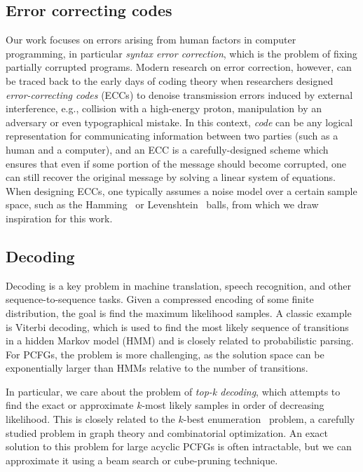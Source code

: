 \documentclass[sigplan,review,acmsmall,nonacm,screen,anonymous]{acmart}\settopmatter{printfolios=false,printccs=false,printacmref=false}
\begin{document}
\subsection{Error correcting codes}

Our work focuses on errors arising from human factors in computer programming, in particular \textit{syntax error correction}, which is the problem of fixing partially corrupted programs. Modern research on error correction, however, can be traced back to the early days of coding theory when researchers designed \textit{error-correcting codes} (ECCs) to denoise transmission errors induced by external interference, e.g., collision with a high-energy proton, manipulation by an adversary or even typographical mistake. In this context, \textit{code} can be any logical representation for communicating information between two parties (such as a human and a computer), and an ECC is a carefully-designed scheme which ensures that even if some portion of the message should become corrupted, one can still recover the original message by solving a linear system of equations. When designing ECCs, one typically assumes a noise model over a certain sample space, such as the Hamming~\cite{titsias2017hamming} or Levenshtein~\cite{levenshtein1966binary, becerra2008learning, barlev2021levenshtein} balls, from which we draw inspiration for this work.

\subsection{Decoding}

Decoding is a key problem in machine translation, speech recognition, and other sequence-to-sequence tasks. Given a compressed encoding of some finite distribution, the goal is find the maximum likelihood samples. A classic example is Viterbi decoding, which is used to find the most likely sequence of transitions in a hidden Markov model (HMM) and is closely related to probabilistic parsing. For PCFGs, the problem is more challenging, as the solution space can be exponentially larger than HMMs relative to the number of transitions.

In particular, we care about the problem of \textit{top-k decoding}, which attempts to find the exact or approximate $k$-most likely samples in order of decreasing likelihood. This is closely related to the $k$-best enumeration~\cite{eppstein2014k} problem, a carefully studied problem in graph theory and combinatorial optimization. An exact solution to this problem for large acyclic PCFGs is often intractable, but we can approximate it using a beam search or cube-pruning technique.
\end{document}
